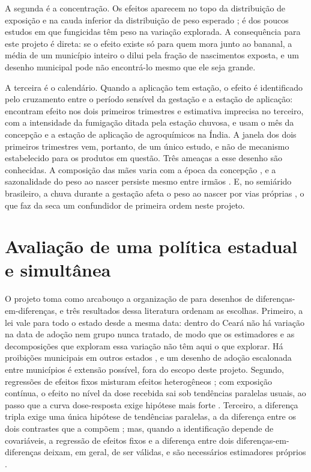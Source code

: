 A segunda é a concentração. Os efeitos aparecem no topo da distribuição de
exposição \cite{larsen2017agricultural} e na cauda inferior da distribuição de
peso esperado \cite{reynier2025glyphosate};  é dos poucos estudos em que fungicidas têm
peso na variação explorada. A consequência para este
projeto é direta: se o efeito existe só para quem mora junto ao bananal, a
média de um município inteiro o dilui pela fração de nascimentos exposta, e um
desenho municipal pode não encontrá-lo mesmo que ele seja grande.

A terceira é o calendário. Quando a aplicação tem estação, o efeito é
identificado pelo cruzamento entre o período sensível da gestação e a estação
de aplicação:  encontram efeito nos dois
primeiros trimestres e estimativa imprecisa no terceiro, com a intensidade da fumigação
ditada pela estação chuvosa, e  usam o mês da
concepção e a estação de aplicação de agroquímicos na Índia. A janela dos dois
primeiros trimestres vem, portanto, de um único estudo, e não de mecanismo
estabelecido para os produtos em questão. Três ameaças a esse desenho são conhecidas. A composição das mães
varia com a época da concepção \cite{buckles2013season}, e a sazonalidade do
peso ao nascer persiste mesmo entre irmãos \cite{currie2013within}. E, no
semiárido brasileiro, a chuva durante a gestação afeta o peso ao nascer por
vias próprias \cite{rocha2015water}, o que faz da seca um confundidor de
primeira ordem neste projeto.

\section{Avaliação de uma política estadual e simultânea}

O projeto toma como arcabouço a organização de 
para desenhos de diferenças-em-diferenças, e três resultados dessa literatura
ordenam as escolhas. Primeiro, a lei vale para todo o estado desde a mesma
data: dentro do Ceará não há variação na data de adoção nem grupo nunca
tratado, de modo que os estimadores e as decomposições que exploram essa
variação \cite{callaway2021multiple,goodmanbacon2021} não têm aqui o que
explorar. Há proibições municipais em outros estados \cite{lavor2019antes}, e
um desenho de adoção escalonada entre municípios é extensão possível, fora do
escopo deste projeto. Segundo, regressões de efeitos fixos misturam efeitos heterogêneos
\cite{dechaisemartin2020}; com exposição contínua, o efeito no nível da dose
recebida sai sob tendências paralelas usuais, ao passo que a curva
dose-resposta exige hipótese mais forte \cite{callaway2024continuous}.
Terceiro, a diferença tripla exige uma única hipótese de tendências paralelas,
a da diferença entre os dois contrastes que a compõem \cite{olden2022triple};
mas, quando a identificação depende de covariáveis, a regressão de efeitos
fixos e a diferença entre dois diferenças-em-diferenças deixam, em geral, de
ser válidas, e são necessários estimadores próprios
\cite{ortiz2025triple}.
